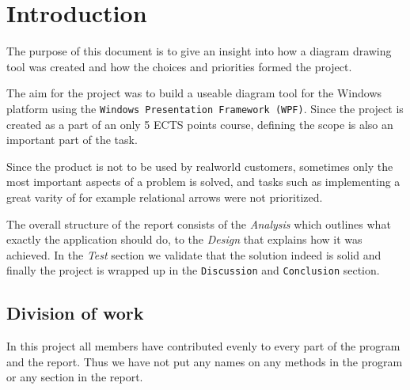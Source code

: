 \section{Introduction}
The purpose of this document is to give an insight into how a diagram drawing
tool was created and how the choices and priorities formed the project. 

The aim for the project was to build a useable diagram tool for the Windows
platform using the \texttt{Windows Presentation Framework (WPF)}. Since the project is
created as a part of an only 5 ECTS points course, defining the scope is also an
important part of the task.

Since the product is not to be used by realworld customers, sometimes only the
most important aspects of a problem is solved, and tasks such as implementing a great varity of for
example relational arrows were not prioritized.

The overall structure of the report consists of the
\textit{Analysis} which outlines what exactly the application should do, to the
\textit{Design} that explains how it was achieved. In the \textit{Test} section
we validate that the solution indeed is solid and finally the project is wrapped
up in the \texttt{Discussion} and \texttt{Conclusion} section.

\subsection{Division of work}
In this project all members have contributed evenly to every part of the 
program and the report. Thus we have not put any names on any methods in the 
program or any section in the report.
